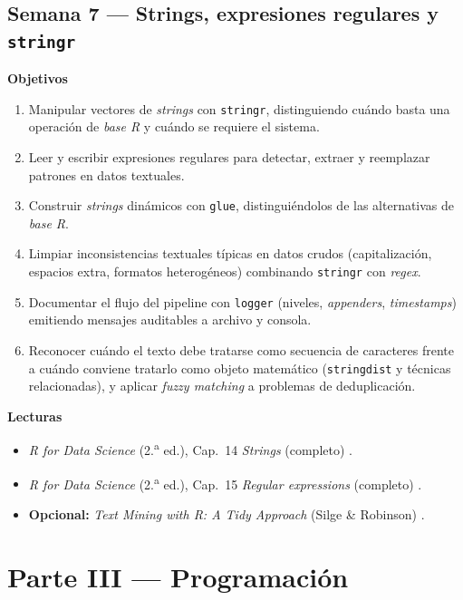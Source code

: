 \documentclass[11pt,letterpaper]{article}
\newcommand{\semanaSucinta}[2]{%
  \subsection*{\color{main}Semana #1 --- #2}%
}
\begin{document}
\semanaSucinta{7}{Strings, expresiones regulares y \texttt{stringr}}

\noindent\textbf{Objetivos}
\begin{enumerate}[leftmargin=*, itemsep=1pt]
    \item Manipular vectores de \textit{strings} con \texttt{stringr}, distinguiendo cuándo basta una operación de \textit{base R} y cuándo se requiere el sistema.
    \item Leer y escribir expresiones regulares para detectar, extraer y reemplazar patrones en datos textuales.
    \item Construir \textit{strings} dinámicos con \texttt{glue}, distinguiéndolos de las alternativas de \textit{base R}.
    \item Limpiar inconsistencias textuales típicas en datos crudos (capitalización, espacios extra, formatos heterogéneos) combinando \texttt{stringr} con \textit{regex}.
    \item Documentar el flujo del pipeline con \texttt{logger} (niveles, \textit{appenders}, \textit{timestamps}) emitiendo mensajes auditables a archivo y consola.
    \item Reconocer cuándo el texto debe tratarse como secuencia de caracteres frente a cuándo conviene tratarlo como objeto matemático (\texttt{stringdist} y técnicas relacionadas), y aplicar \textit{fuzzy matching} a problemas de deduplicación.
\end{enumerate}

\noindent\textbf{Lecturas}
\begin{itemize}[leftmargin=*, itemsep=1pt]
    \item \textit{R for Data Science} (2.\textsuperscript{a} ed.), Cap.\ 14 \textit{Strings} (completo) \cite{wickham2023r4ds}.
    \item \textit{R for Data Science} (2.\textsuperscript{a} ed.), Cap.\ 15 \textit{Regular expressions} (completo) \cite{wickham2023r4ds}.
    \item \textbf{Opcional:} \textit{Text Mining with R: A Tidy Approach} (Silge \& Robinson) \cite{silge-tidytext}.
\end{itemize}

\section*{\color{main}Parte III --- Programación}
\end{document}

